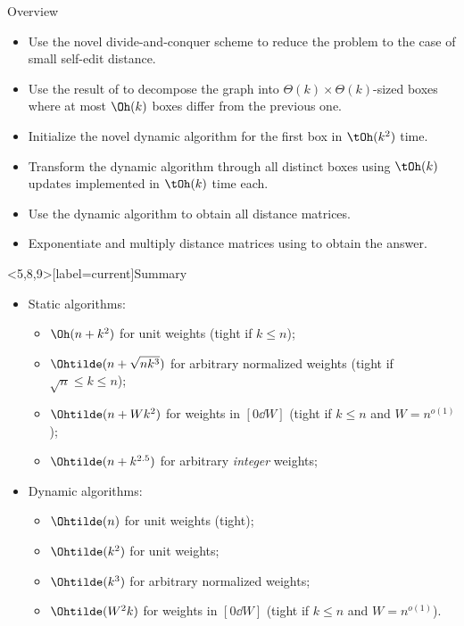   \begin{frame}{Overview}
      \begin{itemize}
          \item<1-> Use the novel divide-and-conquer scheme to reduce the problem to the case of small self-edit distance.
          \item<2-> Use the result of  to decompose the graph into $\Theta(k) \times \Theta(k)$-sized boxes where at most $\Oh(k)$ boxes differ from the previous one.
          \item<3-> Initialize the novel dynamic algorithm for the first box in $\tOh(k^2)$ time.
          \item<4-> Transform the dynamic algorithm through all distinct boxes using $\tOh(k)$ updates implemented in $\tOh(k)$ time each.
          \item<5-> Use the dynamic algorithm to obtain all distance matrices.
          \item<6-> Exponentiate and multiply distance matrices using  to obtain the answer.
      \end{itemize}
  \end{frame}


\begin{frame}<5,8,9>[label=current]{Summary}
    \begin{itemize}
      \item<1-> Static algorithms:
      \begin{itemize}
          \item<2-> $\Oh(n + k^2)$ for unit weights (tight if $k \le n$);\hfill {}
        \item<3-> $\Ohtilde(n+\sqrt{nk^3})$ for arbitrary normalized weights (tight if $\sqrt{n}\le k \le n$);\hfill {}
        \item<4-> $\Ohtilde(n+Wk^2)$ for weights in $[0\dd W]$ (tight if $k \le n$ and $W = n^{o(1)}$);\hfill \thiswork
        \item<5-> $\Ohtilde(n+k^{2.5})$ for arbitrary \emph{integer} weights;\hfill \thiswork
      \end{itemize}
      \item<6-> Dynamic algorithms:
      \begin{itemize}
        \item<6-> $\Ohtilde(n)$ for unit weights (tight);\hfill {}
        \item<7-> $\Ohtilde(k^2)$ for unit weights;
        \item<7-> $\Ohtilde(k^3)$ for arbitrary normalized weights;
        \item<8-> $\Ohtilde(W^2k)$ for weights in $[0\dd W]$ (tight if $k \le n$ and $W = n^{o(1)}$).\hfill \thiswork
      \end{itemize}
    \end{itemize}

\end{frame}

